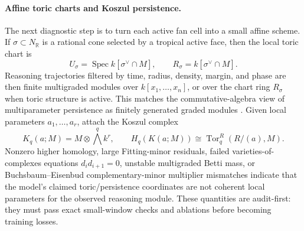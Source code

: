 \documentclass[10pt]{article}
\theoremstyle{definition}
\theoremstyle{plain}
\theoremstyle{remark}
\newcommand{\R}{\mathbb R}
\begin{document}
\paragraph{Affine toric charts and Koszul persistence.}
The next diagnostic step is to turn each active fan cell into a small affine scheme.  If $\sigma\subset N_\R$ is a rational cone selected by a tropical active face, then the local toric chart is
\begin{equation}
  U_\sigma=\operatorname{Spec} k[\sigma^\vee\cap M],
  \qquad R_\sigma=k[\sigma^\vee\cap M].
\end{equation}
Reasoning trajectories filtered by time, radius, density, margin, and phase are then finite multigraded modules over $k[x_1,\ldots,x_n]$, or over the chart ring $R_\sigma$ when toric structure is active.  This matches the commutative-algebra view of multiparameter persistence as finitely generated graded modules \cite{schreiber2022multiparameter}.  Given local parameters $a_1,\ldots,a_r$, attach the Koszul complex
\begin{equation}
  K_q(a;M)=M\otimes \bigwedge^q k^r,\qquad
  H_q(K(a;M))\cong \operatorname{Tor}^{R}_q(R/(a),M).
\end{equation}
Nonzero higher homology, large Fitting-minor residuals, failed varieties-of-complexes equations $d_id_{i+1}=0$, unstable multigraded Betti mass, or Buchsbaum--Eisenbud complementary-minor multiplier mismatches indicate that the model's claimed toric/persistence coordinates are not coherent local parameters for the observed reasoning module.  These quantities are audit-first: they must pass exact small-window checks and ablations before becoming training losses.
\end{document}

